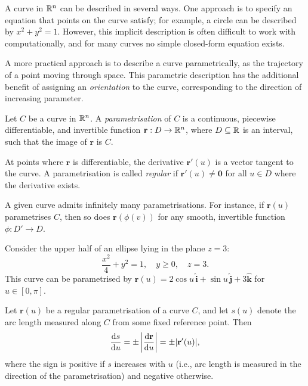 \documentclass[a4paper]{article}
\begin{document}
\begin{rmk}[Motivation]
  A curve in $\mathbb{R}^n$ can be described in several ways. One approach is to specify an equation that points on the curve satisfy; for example, a circle can be described by $x^2 + y^2 = 1$. However, this implicit description is often difficult to work with computationally, and for many curves no simple closed-form equation exists.

  A more practical approach is to describe a curve parametrically, as the trajectory of a point moving through space. This parametric description has the additional benefit of assigning an \emph{orientation} to the curve, corresponding to the direction of increasing parameter.
\end{rmk}

\begin{defi}
  Let $C$ be a curve in $\mathbb{R}^n$. A \emph{parametrisation} of $C$ is a continuous, piecewise differentiable, and invertible function $\mathbf{r}: D \to \mathbb{R}^n$, where $D \subseteq \mathbb{R}$ is an interval, such that the image of $\mathbf{r}$ is $C$.

  At points where $\mathbf{r}$ is differentiable, the derivative $\mathbf{r}'(u)$ is a vector tangent to the curve. A parametrisation is called \emph{regular} if $\mathbf{r}'(u) \neq \mathbf{0}$ for all $u \in D$ where the derivative exists.
\end{defi}

\begin{rmk}
  A given curve admits infinitely many parametrisations. For instance, if $\mathbf{r}(u)$ parametrises $C$, then so does $\mathbf{r}(\phi(v))$ for any smooth, invertible function $\phi: D' \to D$.
\end{rmk}

\begin{eg}
  Consider the upper half of an ellipse lying in the plane $z = 3$:
  \[
    \frac{x^2}{4} + y^2 = 1, \quad y \geq 0, \quad z = 3.
  \]
  This curve can be parametrised by $\mathbf{r}(u) = 2\cos u\,\hat{\mathbf{i}} + \sin u\,\hat{\mathbf{j}} + 3\hat{\mathbf{k}}$ for $u \in [0, \pi]$.
\end{eg}

\begin{prop}
  Let $\mathbf{r}(u)$ be a regular parametrisation of a curve $C$, and let $s(u)$ denote the arc length measured along $C$ from some fixed reference point. Then
  \[
    \frac{\mathrm{d} s}{\mathrm{d} u} = \pm \left|\frac{\mathrm{d} \mathbf{r}}{\mathrm{d} u}\right| = \pm |\mathbf{r}'(u)|,
  \]
  where the sign is positive if $s$ increases with $u$ (i.e., arc length is measured in the direction of the parametrisation) and negative otherwise.
\end{prop}
\end{document}
